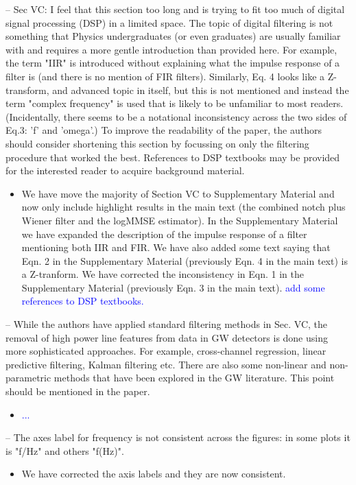 \documentclass{article}
\newcommand{\todo}{\textcolor{blue}}
\begin{document}
\noindent
-- Sec VC: I feel that this section too long and is trying to fit too much of digital signal processing (DSP) in a limited space. The topic of digital filtering is not something that Physics undergraduates (or even graduates) are usually familiar with and requires a more gentle introduction than provided here. For example, the term "IIR" is introduced without explaining what the impulse response of a filter is (and there is no mention of FIR filters). Similarly, Eq. 4 looks like a Z-transform, and advanced topic in itself, but this is not mentioned and instead the term "complex frequency" is used that is likely to be unfamiliar to most readers. (Incidentally, there seems to be a notational inconsistency across the two sides of Eq.3: 'f' and 'omega'.) To improve the readability of the paper, the authors should consider shortening this section by focussing on only the filtering procedure that worked the best. References to DSP textbooks may be provided for the interested reader to acquire background material. 
\begin{itemize}
\item We have move the majority of Section VC to Supplementary Material and now only include highlight results in the main text (the combined notch plus Wiener filter and the logMMSE estimator). In the Supplementary Material we have expanded the description of the impulse response of a filter mentioning both IIR and FIR. We have also added some text saying that Eqn. 2 in the Supplementary Material (previously Eqn. 4 in the main text) is a Z-tranform. We have corrected the inconsistency in Eqn. 1 in the Supplementary Material (previously Eqn. 3 in the main text). 
\todo{add some references to DSP textbooks.}
\end{itemize}

\noindent
-- While the authors have applied standard filtering methods in Sec. VC, the removal of high power line features from data in GW detectors is done using more sophisticated approaches. For example, cross-channel regression, linear predictive filtering, Kalman filtering etc. There are also some non-linear and non-parametric methods that have been explored in the GW literature. This point should be mentioned in the paper.
\begin{itemize}
\item \todo{...}
\end{itemize}

\noindent
-- The axes label for frequency is not consistent across the figures: in some plots it is "f/Hz" and others "f(Hz)".
\begin{itemize}
\item We have corrected the axis labels and they are now consistent.
\end{itemize}
\end{document}
